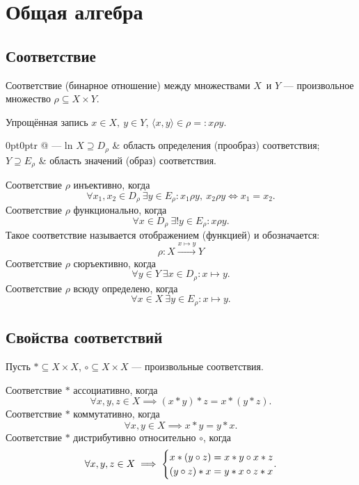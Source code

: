 \section{Общая алгебра}

\subsection{Соответствие}

{\bold Соответствие} {\ital (бинарное отношение)} между множествами
$X$~и $Y$ --- произвольное множество $\rho\subseteq X\times Y$.\par
Упрощённая запись $x\in X,\ y\in Y$, $\langle x, y\rangle\in\rho=:x\rho y$.\par

\begin{tabularc}{0pt}{0pt}{r @{ --- } l}{n}
$X\supseteq D_\rho$ & область определения {\ital (прообраз)} соответствия;\\
$Y\supseteq E_\rho$ & область значений {\ital (образ)} соответствия.
\end{tabularc} 

Соответствие $\rho$ {\ital инъективно}, когда
$$\forall x_1,x_2\in D_\rho\ \exists y\in E_\rho\colon x_1\rho y,\ x_2\rho y\iff
x_1=x_2.$$
Соответствие $\rho$ {\ital функционально}, когда
$$\forall x\in D_\rho\ \exists! y\in E_\rho\colon x\rho y.$$
Такое соответствие называется {\bold отображением} {\ital (функцией)}
и обозначается:
$$\rho\colon X\xrightarrow{x\mapsto y} Y$$
Соответствие $\rho$ {\ital сюръективно}, когда
$$\forall y\in Y\ \exists x\in D_\rho\colon x\mapsto y.$$
Соответствие $\rho$ {\ital всюду определено}, когда
$$\forall x\in X\ \exists y\in E_\rho\colon x\mapsto y.$$

\subsection{Свойства соответствий}

Пусть $\ast\subseteq X\times X$, $\circ\subseteq X\times X$ --- произвольные
соответствия.\par

Соответствие $\ast$ {\ital ассоциативно}, когда
$$\forall x,y,z\in X\implies (x\ast y)\ast z=x\ast (y\ast z).$$
Соответствие $\ast$ {\ital коммутативно}, когда
$$\forall x,y\in X\implies x\ast y=y\ast x.$$
Соответствие $\ast$ {\ital дистрибутивно} относительно $\circ$, когда
$$\forall x,y,z\in X\implies
\begin{cases}
x\ast(y\circ z)=x\ast y\circ x\ast z\\
(y\circ z)\ast x=y\ast x\circ z\ast x
\end{cases}\hspace{-12pt}.$$

